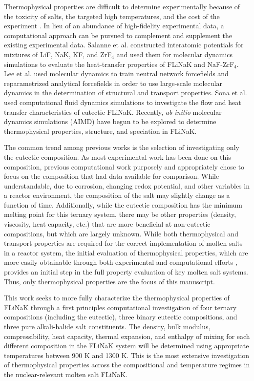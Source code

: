 \documentclass[preprint,12pt]{elsarticle}
\begin{document}
Thermophysical properties are difficult to determine experimentally because of the toxicity of salts, the targeted high temperatures, and the cost of the experiment \cite{Porter2022}. In lieu of an abundance of high-fidelity experimental data, a computational approach can be pursued to complement and supplement the existing experimental data. Salanne et al. constructed interatomic potentials for mixtures of LiF, NaK, KF, and ZrF$_4$ and used them for molecular dynamics simulations to evaluate the heat-transfer properties of FLiNaK and NaF-ZrF$_4$\cite{Salanne2009}. Lee et al. used molecular dynamics to train neutral network forcefields and reparametrized analytical forcefields in order to use large-scale molecular dynamics in the determination of structural and transport properties\cite{Lee2021}. Sona et al. used computational fluid dynamics simulations to investigate the flow and heat transfer characteristics of eutectic FLiNaK\cite{Sona2014}. Recently, \textit{ab initio} molecular dynamics simulations (AIMD) have begun to be explored to determine thermophysical properties, structure, and speciation in FLiNaK\cite{Nam2014,Frandsen2020,Clark2020,Sprouster2022}. 

The common trend among previous works is the selection of investigating only the eutectic composition. As most experimental work has been done on this composition, previous computational work purposely and appropriately chose to focus on the composition that had data available for comparison. While understandable, due to corrosion, changing redox potential, and other variables in a reactor environment, the composition of the salt may slightly change as a function of time. Additionally, while the eutectic composition has the minimum melting point for this ternary system, there may be other properties (density, viscosity, heat capacity, etc.) that are more beneficial at non-eutectic compositions, but which are largely unknown\cite{Benes2009}. While both thermophysical and transport properties are required for the correct implementation of molten salts in a reactor system, the initial evaluation of thermophysical properties, which are more easily obtainable through both experimental and computational efforts \cite{Duemmler2022,Duemmler2023,Zhao2023}, provides an initial step in the full property evaluation of key molten salt systems. Thus, only thermophysical properties are the focus of this manuscript. 

This work seeks to more fully characterize the thermophysical properties of FLiNaK through a first principles computational investigation of four ternary compositions (including the eutectic), three binary eutectic compositions, and three pure alkali-halide salt constituents. The density, bulk modulus, compressibility, heat capacity, thermal expansion, and enthalpy of mixing for each different composition in the FLiNaK system will be determined using appropriate temperatures between 900 K and 1300 K. This is the most extensive investigation of thermophysical properties across the compositional and temperature regimes in the nuclear-relevant molten salt FLiNaK.
\end{document}
